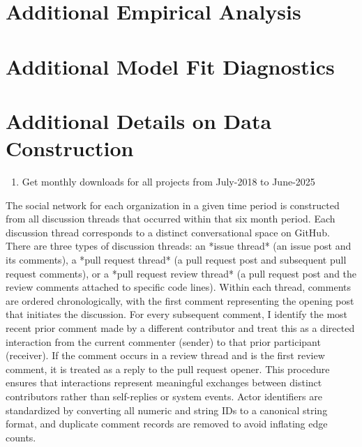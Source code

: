 \documentclass[12pt,notitlepage]{article}
\renewcommand{\thesubsection}{\arabic{section}.\arabic{subsection}}
\begin{document}
\clearpage


\appendix


\renewcommand{\thesection}{\Alph{section}}
\renewcommand{\thesubsection}{\thesection.\arabic{subsection}}
\setcounter{figure}{0}
\renewcommand{\thefigure}{A\arabic{figure}}

\section{Additional Empirical Analysis}\label{sec:app_analysis}



\section{Additional Model Fit Diagnostics}\label{sec:app_model_fit}










\section{Additional Details on Data Construction}\label{sec:app_data}
\begin{enumerate}
    \item Get monthly downloads for all projects from July-2018 to June-2025
\end{enumerate}


The social network for each organization in a given time period is constructed from all discussion threads that occurred within that six month period.
Each discussion thread corresponds to a distinct conversational space on GitHub.
There are three types of discussion threads: an *issue thread* (an issue post and its comments), a *pull request thread* (a pull request post and subsequent pull request comments), or a *pull request review thread* (a pull request post and the review comments attached to specific code lines).
Within each thread, comments are ordered chronologically, with the first comment representing the opening post that initiates the discussion.
For every subsequent comment, I identify the most recent prior comment made by a different contributor and treat this as a directed interaction from the current commenter (sender) to that prior participant (receiver).
If the comment occurs in a review thread and is the first review comment, it is treated as a reply to the pull request opener.
This procedure ensures that interactions represent meaningful exchanges between distinct contributors rather than self-replies or system events.
Actor identifiers are standardized by converting all numeric and string IDs to a canonical string format, and duplicate comment records are removed to avoid inflating edge counts.
\end{document}
